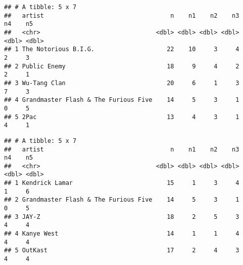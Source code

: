 \documentclass[
]{article}
\newenvironment{Shaded}{\begin{snugshade}}{\end{snugshade}}
\newcommand{\DecValTok}[1]{\textcolor[rgb]{0.00,0.00,0.81}{#1}}
\newcommand{\KeywordTok}[1]{\textcolor[rgb]{0.13,0.29,0.53}{\textbf{#1}}}
\newcommand{\NormalTok}[1]{#1}
\newcommand{\OperatorTok}[1]{\textcolor[rgb]{0.81,0.36,0.00}{\textbf{#1}}}
\newcommand{\StringTok}[1]{\textcolor[rgb]{0.31,0.60,0.02}{#1}}
\begin{document}
\begin{verbatim}
## # A tibble: 5 x 7
##   artist                                   n    n1    n2    n3    n4    n5
##   <chr>                                <dbl> <dbl> <dbl> <dbl> <dbl> <dbl>
## 1 The Notorious B.I.G.                    22    10     3     4     2     3
## 2 Public Enemy                            18     9     4     2     2     1
## 3 Wu-Tang Clan                            20     6     1     3     7     3
## 4 Grandmaster Flash & The Furious Five    14     5     3     1     0     5
## 5 2Pac                                    13     4     3     1     4     1
\end{verbatim}

\begin{Shaded}
\end{Shaded}

\begin{verbatim}
## # A tibble: 5 x 7
##   artist                                   n    n1    n2    n3    n4    n5
##   <chr>                                <dbl> <dbl> <dbl> <dbl> <dbl> <dbl>
## 1 Kendrick Lamar                          15     1     3     4     1     6
## 2 Grandmaster Flash & The Furious Five    14     5     3     1     0     5
## 3 JAY-Z                                   18     2     5     3     4     4
## 4 Kanye West                              14     1     1     4     4     4
## 5 OutKast                                 17     2     4     3     4     4
\end{verbatim}
\end{document}
